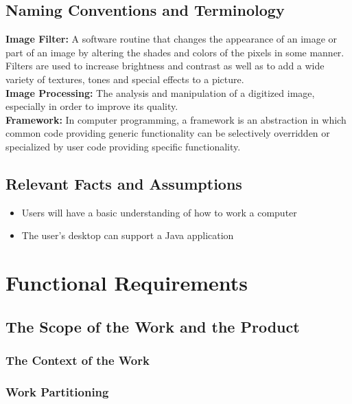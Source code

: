 \documentclass[12pt, titlepage]{article}
\begin{document}
\subsection{Naming Conventions and Terminology}

{\bf Image Filter:} A software routine that changes the appearance of an image or part of an image by altering the shades and colors of the pixels in some manner. Filters are used to increase brightness and contrast as well as to add a wide variety of textures, tones and special effects to a picture.\\

{\bf Image Processing:} The analysis and manipulation of a digitized image, especially in order to improve its quality.\\

{\bf Framework:} In computer programming, a framework is an abstraction in which common code providing generic functionality can be selectively overridden or specialized by user code providing specific functionality.


\subsection{Relevant Facts and Assumptions}

\begin{itemize}
  \item Users will have a basic understanding of how to work a computer
  \item The user's desktop can support a Java application
\end{itemize}

\section{Functional Requirements}

\subsection{The Scope of the Work and the Product}

\subsubsection{The Context of the Work}

\subsubsection{Work Partitioning}
\end{document}
